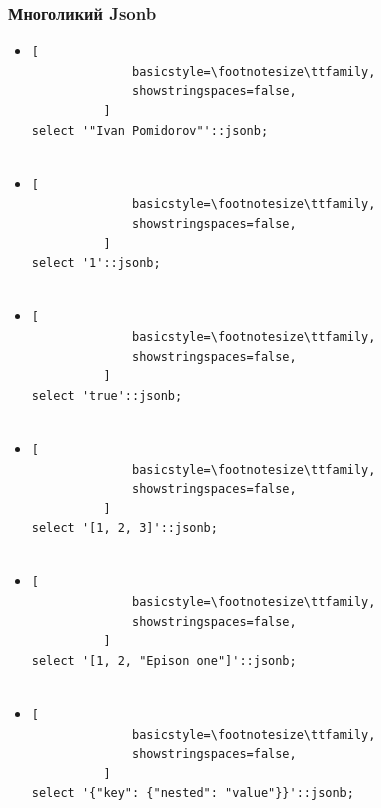 \documentclass[14pt, compress, aspectratio=169]{beamer}
\begin{document}
\begin{frame}[fragile]
    \frametitle{Многоликий Jsonb}

  \begin{itemize}
      \item<+->
          \begin{lstlisting}[
              basicstyle=\footnotesize\ttfamily,
              showstringspaces=false,
          ]
select '"Ivan Pomidorov"'::jsonb;
         
          \end{lstlisting}

      \item<+->
          \begin{lstlisting}[
              basicstyle=\footnotesize\ttfamily,
              showstringspaces=false,
          ]
select '1'::jsonb;
         
          \end{lstlisting}

      \item<+->
          \begin{lstlisting}[
              basicstyle=\footnotesize\ttfamily,
              showstringspaces=false,
          ]
select 'true'::jsonb;
         
          \end{lstlisting}

      \item<+->
          \begin{lstlisting}[
              basicstyle=\footnotesize\ttfamily,
              showstringspaces=false,
          ]
select '[1, 2, 3]'::jsonb;
         
          \end{lstlisting}

      \item<+->
          \begin{lstlisting}[
              basicstyle=\footnotesize\ttfamily,
              showstringspaces=false,
          ]
select '[1, 2, "Epison one"]'::jsonb;
         
          \end{lstlisting}

      \item<+->
          \begin{lstlisting}[
              basicstyle=\footnotesize\ttfamily,
              showstringspaces=false,
          ]
select '{"key": {"nested": "value"}}'::jsonb;
         
          \end{lstlisting}

  \end{itemize}

\end{frame}
\end{document}
